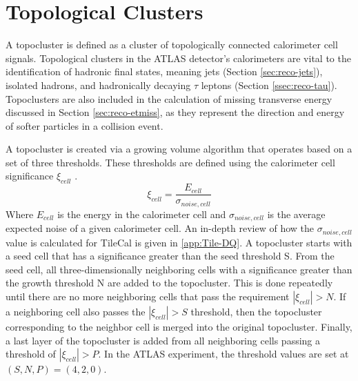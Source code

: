 
	\section{Topological Clusters}
	A topocluster is defined as a cluster of topologically connected calorimeter cell signals. Topological clusters in the ATLAS detector's calorimeters are vital to the identification of hadronic final states, meaning jets (Section \ref{sec:reco-jets}), isolated hadrons, and hadronically decaying $\tau$ leptons (Section \ref{ssec:reco-tau}). Topoclusters are also included in the calculation of missing transverse energy discussed in Section \ref{sec:reco-etmiss}, as they represent the direction and energy of softer particles in a collision event. 

	A topocluster is created via a growing volume algorithm that operates based on a set of three thresholds. These thresholds are defined using the calorimeter cell significance $\xi_{cell}$ \cite{topocluster-perf}. 
	\begin{equation}
	\xi_{cell} = \frac{E_{cell}}{\sigma_{noise, cell}}
	\end{equation}
	Where $E_{cell}$ is the energy in the calorimeter cell and $\sigma_{noise, cell}$ is the average expected noise of a given calorimeter cell. An in-depth review of how the $\sigma_{noise, cell}$ value is calculated for TileCal is given in \ref{app:Tile-DQ}. A topocluster starts with a seed cell that has a significance greater than the seed threshold S. From the seed cell, all three-dimensionally neighboring cells with a significance greater than the growth threshold N are added to the topocluster. This is done repeatedly until there are no more neighboring cells that pass the requirement $|\xi_{cell}|>N$. If a neighboring cell also passes the $|\xi_{cell}|>S$ threshold, then the topocluster corresponding to the neighbor cell is merged into the original topocluster. Finally, a last layer of the topocluster is added from all neighboring cells passing a threshold of $|\xi_{cell}|>P$. In the ATLAS experiment, the threshold values are set at $(S,N,P) = (4,2,0)$.

